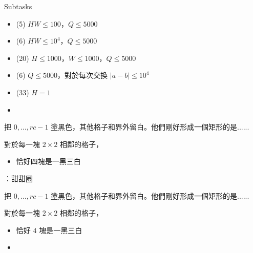 \begin{frame}{}
    \begin{problem}
        Subtasks

        \begin{itemize}
            \item (5) $HW \le 100$，$Q \le 5000$
            \item (6) $HW \le 10^4$，$Q \le 5000$
            \item (20) $H \le 1000$，$W \le 1000$，$Q \le 5000$
            \item (6) $Q \le 5000$，對於每次交換 $|a - b| \le 10^4$
            \item (33) $H = 1$
            \item {}
        \end{itemize}
    \end{problem}

\end{frame}

\begin{frame}{}
    \todo
\end{frame}

\begin{frame}{}
    把 $0, \dots, rc - 1$ 塗黑色，其他格子和界外留白。他們剛好形成一個矩形的是......

     {
        對於每一塊 $2 \times 2$ 相鄰的格子，
        \begin{itemize}
            \item 恰好四塊是一黑三白
        \end{itemize}
    }
\end{frame}

\begin{frame}{}
    \todo：甜甜圈
\end{frame}

\begin{frame}{}
    把 $0, \dots, rc - 1$ 塗黑色，其他格子和界外留白。他們剛好形成一個矩形的是......

    對於每一塊 $2 \times 2$ 相鄰的格子，
    \begin{itemize}
        \item 恰好 $4$ 塊是一黑三白
        \item {}
    \end{itemize}
\end{frame}

